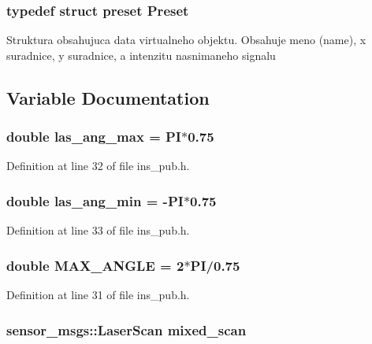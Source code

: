 \subsubsection[{Preset}]{\setlength{\rightskip}{0pt plus 5cm}typedef struct {\bf preset} {\bf Preset}}\label{ins__pub_8h_aba266741f5e08c118d22f0da93fe9e4a}
Struktura obsahujuca data virtualneho objektu. Obsahuje meno (name), x suradnice, y suradnice, a intenzitu nasnimaneho signalu 

\subsection{Variable Documentation}
\subsubsection[{las\_\-ang\_\-max}]{\setlength{\rightskip}{0pt plus 5cm}double {\bf las\_\-ang\_\-max} = PI$\ast$0.75}\label{ins__pub_8h_ab83311036cf2c6243184887da554a036}


Definition at line 32 of file ins\_\-pub.h.

\subsubsection[{las\_\-ang\_\-min}]{\setlength{\rightskip}{0pt plus 5cm}double {\bf las\_\-ang\_\-min} = -\/PI$\ast$0.75}\label{ins__pub_8h_a160d940f8bd263498c1641fca83f2585}


Definition at line 33 of file ins\_\-pub.h.

\subsubsection[{MAX\_\-ANGLE}]{\setlength{\rightskip}{0pt plus 5cm}double {\bf MAX\_\-ANGLE} = 2$\ast$PI/0.75}\label{ins__pub_8h_ac32ec987dfc5022ee8e26d4f2fd05732}


Definition at line 31 of file ins\_\-pub.h.

\subsubsection[{mixed\_\-scan}]{\setlength{\rightskip}{0pt plus 5cm}sensor\_\-msgs::LaserScan {\bf mixed\_\-scan}}\label{ins__pub_8h_aad1de035bfed6f3c908d6f72a2ec2d1e}


